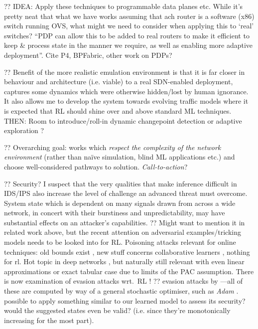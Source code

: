\documentclass[conference, letterpaper, 10pt, times]{IEEEtran}
\begin{document}
?? IDEA: Apply these techniques to programmable data planes etc. While it's pretty neat that what we have works assuming that ach router is a software (x86) switch running OVS, what might we need to consider when applying this to `real' switches? ``PDP can allow this to be added to real routers to make it efficient to keep \& process state in the manner we require, as well as enabling more adaptive deployment''. Cite P4, BPFabric, other work on PDPs?

?? Benefit of the more realistic emulation environment is that it is far closer in behaviour and architecture (i.e. viable) to a real SDN-enabled deployment, captures some dynamics which were otherwise hidden/lost by human ignorance. It also allows me to develop the system towards evolving traffic models where it is expected that RL should shine over and above standard ML techniques. THEN: Room to introduce/roll-in dynamic changepoint detection or adaptive exploration \cite{DBLP:conf/ki/Tokic10, DBLP:conf/ki/TokicP11, DBLP:conf/annpr/TokicP12}?

?? Overarching goal: works which \emph{respect the complexity of the network environment} (rather than na\"{i}ve simulation, blind ML applications etc.) and choose well-considered pathways to solution. \emph{Call-to-action}?

?? Security? I suspect that the very qualities that make inference difficult in IDS/IPS also increase the level of challenge an advanced threat must overcome.
System state which is dependent on many signals drawn from across a wide network, in concert with their burstiness and unpredictability, may have substantial effects on an attacker's capabilities.
?? Might want to mention it in related work above, but the recent attention on adversarial examples/tricking models needs to be looked into for RL. Poisoning attacks relevant for online techniques: old bounds exist \textcite{DBLP:journals/jmlr/KloftL10}, new stuff concerns collaborative learners \cite{DBLP:conf/acsac/ShenTS16}, nothing for rl. Hot topic in deep networks \cite{DBLP:conf/eurosp/PapernotMJFCS16, DBLP:conf/eurosp/PapernotMSW18}, but naturally still relevant with even linear approximations or exact tabular case due to limits of the PAC assumption. There is now examination of evasion attacks wrt.\ RL \cite{DBLP:journals/corr/HuangPGDA17}!
?? evasion attacks by \textcite{DBLP:conf/sp/Carlini017}---all of these are computed by way of a general stochastic optimiser, such as \emph{Adam} \cite{DBLP:journals/corr/KingmaB14}. possible to apply something similar to our learned model to assess its security? would the suggested states even be valid? (i.e. since they're monotonically increasing for the most part).
\end{document}
